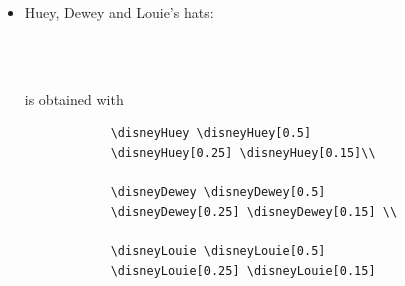 \documentclass{article}
\begin{document}
\begin{itemize}
  \item Huey, Dewey and Louie's hats:
        \begin{center}
            \disneyHuey \disneyHuey[0.5] \disneyHuey[0.25] \disneyHuey[0.15]\\
            \disneyDewey \disneyDewey[0.5] \disneyDewey[0.25] \disneyDewey[0.15] \\
            \disneyLouie \disneyLouie[0.5] \disneyLouie[0.25] \disneyLouie[0.15]
        \end{center}
        is obtained with 
        \begin{verbatim}
            \disneyHuey \disneyHuey[0.5] 
            \disneyHuey[0.25] \disneyHuey[0.15]\\
            
            \disneyDewey \disneyDewey[0.5] 
            \disneyDewey[0.25] \disneyDewey[0.15] \\
            
            \disneyLouie \disneyLouie[0.5] 
            \disneyLouie[0.25] \disneyLouie[0.15]
        \end{verbatim}
\end{itemize}
\end{document}
